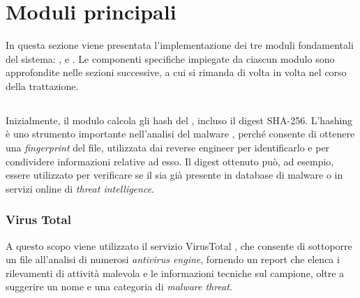 
\section{Moduli principali} %

In questa sezione viene presentata l'implementazione dei tre moduli fondamentali del sistema: \classifier{}, \sreagent{} e \codeagent{}. Le componenti specifiche impiegate da ciascun modulo sono approfondite nelle sezioni successive, a cui si rimanda di volta in volta nel corso della trattazione.

\subsection{\classifier{}} %

Inizialmente, il modulo calcola gli hash del \binary{}, incluso il digest SHA-256. L'hashing è uno strumento importante nell'analisi del malware \cite{sikorski2012malware}, perché consente di ottenere una \emph{fingerprint} del file, utilizzata dai reverse engineer per identificarlo e per condividere informazioni relative ad esso. Il digest ottenuto può, ad esempio, essere utilizzato per verificare se il \binary{} sia già presente in database di malware o in servizi online di \emph{threat intelligence}.


\subsubsection{Virus Total}

A questo scopo viene utilizzato il servizio VirusTotal \cite{virustotal2026vt}, che consente di sottoporre un file all'analisi di numerosi \emph{antivirus engine}, fornendo un report che elenca i rilevamenti di attività malevola e le informazioni tecniche sul campione, oltre a suggerire un nome e una categoria di \emph{malware threat}.

